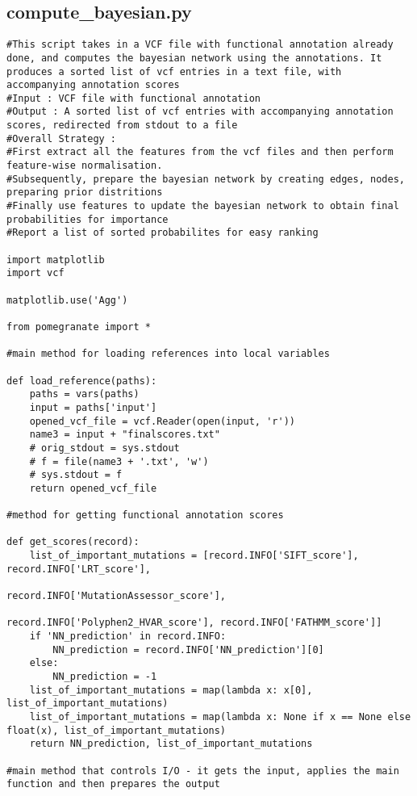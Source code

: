 \documentclass{article}
\begin{document}
\subsection{compute\_bayesian.py}
\begin{verbatim}
#This script takes in a VCF file with functional annotation already done, and computes the bayesian network using the annotations. It produces a sorted list of vcf entries in a text file, with accompanying annotation scores
#Input : VCF file with functional annotation
#Output : A sorted list of vcf entries with accompanying annotation scores, redirected from stdout to a file
#Overall Strategy :
#First extract all the features from the vcf files and then perform feature-wise normalisation. 
#Subsequently, prepare the bayesian network by creating edges, nodes, preparing prior distritions
#Finally use features to update the bayesian network to obtain final probabilities for importance
#Report a list of sorted probabilites for easy ranking

import matplotlib
import vcf

matplotlib.use('Agg')

from pomegranate import *

#main method for loading references into local variables

def load_reference(paths):
    paths = vars(paths)
    input = paths['input']
    opened_vcf_file = vcf.Reader(open(input, 'r'))
    name3 = input + "finalscores.txt"
    # orig_stdout = sys.stdout
    # f = file(name3 + '.txt', 'w')
    # sys.stdout = f
    return opened_vcf_file

#method for getting functional annotation scores

def get_scores(record):
    list_of_important_mutations = [record.INFO['SIFT_score'], record.INFO['LRT_score'],
                                   record.INFO['MutationAssessor_score'],
                                   record.INFO['Polyphen2_HVAR_score'], record.INFO['FATHMM_score']]
    if 'NN_prediction' in record.INFO:
        NN_prediction = record.INFO['NN_prediction'][0]
    else:
        NN_prediction = -1
    list_of_important_mutations = map(lambda x: x[0], list_of_important_mutations)
    list_of_important_mutations = map(lambda x: None if x == None else float(x), list_of_important_mutations)
    return NN_prediction, list_of_important_mutations

#main method that controls I/O - it gets the input, applies the main function and then prepares the output


\end{verbatim}
\end{document}
